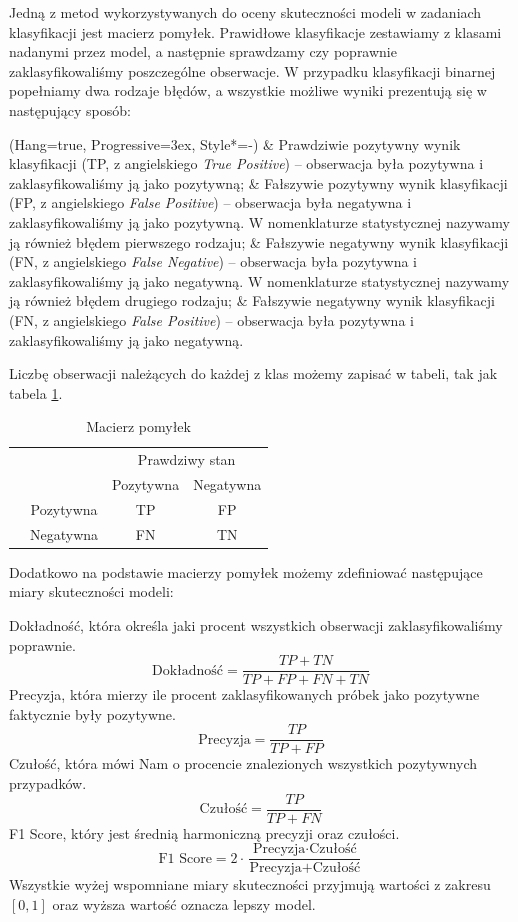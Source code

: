 \documentclass[inzynierska]{pwr_wmat_praca_dyplomowa}
\theoremstyle{plain}
\numberwithin{theorem}{chapter}
\theoremstyle{definition}
\numberwithin{theorem}{chapter}
\begin{document}
Jedną z metod wykorzystywanych do oceny skuteczności modeli w zadaniach klasyfikacji jest macierz pomyłek. Prawidłowe klasyfikacje zestawiamy z klasami nadanymi przez model, a następnie sprawdzamy czy poprawnie zaklasyfikowaliśmy poszczególne obserwacje. W przypadku klasyfikacji binarnej popełniamy dwa rodzaje błędów, a wszystkie możliwe wyniki prezentują się w następujący sposób:
\begin{easylist}[itemize]
	\ListProperties(Hang=true, Progressive=3ex, Style*=-)
	& Prawdziwie pozytywny wynik klasyfikacji (TP, z angielskiego \textit{True Positive}) -- obserwacja była pozytywna i zaklasyfikowaliśmy ją jako pozytywną;
	& Fałszywie pozytywny wynik klasyfikacji (FP, z angielskiego \textit{False Positive}) -- obserwacja była negatywna i zaklasyfikowaliśmy ją jako pozytywną. W nomenklaturze statystycznej nazywamy ją również błędem pierwszego rodzaju;
	& Fałszywie negatywny wynik klasyfikacji (FN, z angielskiego \textit{False Negative}) -- obserwacja była pozytywna i zaklasyfikowaliśmy ją jako negatywną. W nomenklaturze statystycznej nazywamy ją również błędem drugiego rodzaju;
	& Fałszywie negatywny wynik klasyfikacji (FN, z angielskiego \textit{False Positive}) -- obserwacja była pozytywna i zaklasyfikowaliśmy ją jako negatywną.
\end{easylist}
\noindent Liczbę obserwacji należących do każdej z klas możemy zapisać w tabeli, tak jak tabela \ref{macierz-pomylek}.
\begin{table}[h]
	\begin{center}
		\makegapedcells
		\begin{tabular}{cc|cc}
			\multicolumn{2}{c}{}     &   \multicolumn{2}{c}{Prawdziwy stan} \\
			&            &   Pozytywna &   Negatywna     \\ 
			\cline{2-4}
			\multirow{2}{*}{\rotatebox[origin=c]{90}{Predykcja}} & Pozytywna   & TP         & FP              \\
			& Negatywna   & FN         & TN              \\ 
			\cline{2-4}
		\end{tabular}
	\end{center}
	\caption{Macierz pomyłek}
	\label{macierz-pomylek}
\end{table}

Dodatkowo na podstawie macierzy pomyłek możemy zdefiniować następujące miary skuteczności modeli:

Dokładność, która określa jaki procent wszystkich obserwacji zaklasyfikowaliśmy poprawnie.
$$ \text{Dokładność} = \frac{TP + TN}{TP + FP + FN + TN} $$
Precyzja, która mierzy ile procent zaklasyfikowanych próbek jako pozytywne faktycznie były pozytywne.
$$ \text{Precyzja} = \frac{TP}{TP + FP} $$
Czułość, która mówi Nam o procencie znalezionych wszystkich pozytywnych przypadków.
$$ \text{Czułość}= \frac{TP}{TP + FN} $$
F1 Score, który jest średnią harmoniczną precyzji oraz czułości.
$$ \text{F1 Score} = 2 \cdot \frac{\text{Precyzja} \cdot \text{Czułość}}{\text{Precyzja} + \text{Czułość}} $$
Wszystkie wyżej wspomniane miary skuteczności przyjmują wartości z zakresu $[0,1]$ oraz wyższa wartość oznacza lepszy model.
\end{document}
